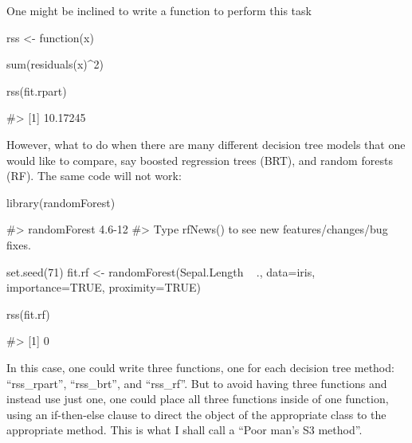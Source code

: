 One might be inclined to write a function to perform this task

\begin{Schunk}
\begin{Sinput}
rss <- function(x){
  
  sum(residuals(x)^2)
  
}

rss(fit.rpart)
\end{Sinput}
\begin{Soutput}
#> [1] 10.17245
\end{Soutput}
\end{Schunk}

However, what to do when there are many different decision tree models
that one would like to compare, say boosted regression trees (BRT), and
random forests (RF). The same code will not work:

\begin{Schunk}
\begin{Sinput}
library(randomForest)
\end{Sinput}
\begin{Soutput}
#> randomForest 4.6-12
#> Type rfNews() to see new features/changes/bug fixes.
\end{Soutput}
\begin{Sinput}
set.seed(71)
fit.rf <- randomForest(Sepal.Length ~ ., data=iris, importance=TRUE,
                        proximity=TRUE)

rss(fit.rf)
\end{Sinput}
\begin{Soutput}
#> [1] 0
\end{Soutput}
\end{Schunk}

In this case, one could write three functions, one for each decision
tree method: ``rss\_rpart'', ``rss\_brt'', and ``rss\_rf''. But to avoid
having three functions and instead use just one, one could place all
three functions inside of one function, using an if-then-else clause to
direct the object of the appropriate class to the appropriate method.
This is what I shall call a ``Poor man's S3 method''.

